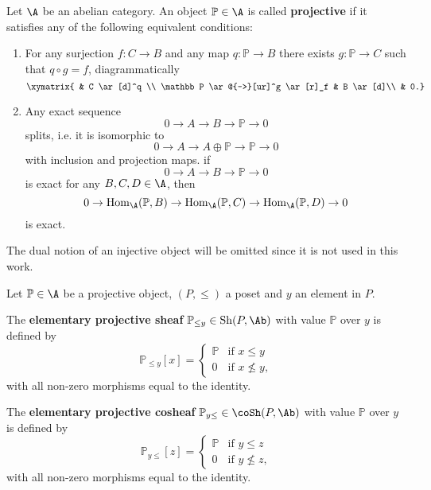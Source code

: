 \documentclass[thesis.tex]{subfiles}
\begin{document}
\begin{definition} \label{Projective objects}
	Let $\A$ be an abelian category.
	An object $\mathbb P\in\A$ is called \textbf{projective} if it satisfies any of the following equivalent conditions:
	\begin{enumerate}
	\item For any surjection $f:C\to B$ and any map $q:\mathbb P\to B$ there exists $g:\mathbb P\to C$ such that $q\circ g=f$, diagrammatically $$\xymatrix
	{  & C \ar[d]^q \\
	\mathbb P \ar@{-->}[ur]^g \ar[r]_f & B \ar[d]\\
	   & 0.}\vspace*{-8pt}$$
	\item Any exact sequence $$0\to A\to B\to \mathbb P\to 0$$ splits, i.e.
	it is isomorphic to $$0\to A\to A\oplus\mathbb P\to \mathbb P\to 0$$ with inclusion and projection maps.
	if $$0\to A\to B\to \mathbb P\to 0$$ is exact for any $B,C,D\in\A$, then $$0\to\Hom_{\A}(\mathbb P,B)\to\Hom_{\A}(\mathbb P,C)\to \Hom_{\A}(\mathbb P,D)\to 0$$ is exact.
	\end{enumerate}
\end{definition}

\begin{remark}
	The dual notion of an injective object will be omitted since it is not used in this work.
\end{remark}

\begin{definition}
	Let $\mathbb P\in\A$ be a projective object, $(P,\leq)$ a poset and $y$ an element in $P$.

	The \textbf{elementary projective sheaf} $\mathbb P_{\leq y}\in\Sh(P,\Ab)$ with value $\mathbb P$ over $y$ is defined by
	$$\mathbb P_{\leq y}[x]=\begin{cases}\mathbb P & \text{if } x\leq y \\ 0 & \text{if } x\nleq y, \end{cases}$$
	with all non-zero morphisms equal to the identity.

	The \textbf{elementary projective cosheaf} $\mathbb P_{y\leq }\in\coSh(P,\Ab)$ with value $\mathbb P$ over $y$ is defined by
	$$\mathbb P_{y\leq}[z]=\begin{cases}\mathbb P & \text{if } y\leq z \\ 0 & \text{if } y\nleq z, \end{cases}$$
	with all non-zero morphisms equal to the identity.
\end{definition}
\end{document}
